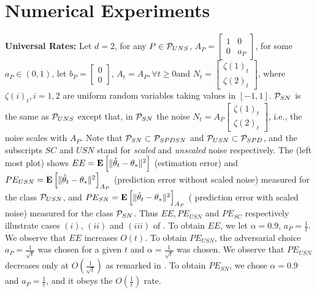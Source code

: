 \section{Numerical Experiments}\label{sec:exp}

\textbf{Universal Rates:} Let $d=2$, for any $P\in \P_{UNS}$, $A_P=\left[\begin{matrix}1 &0\\ 0 & a_P\end{matrix}\right]$, for some $a_P\in (0,1)$, let $b_P=\left[\begin{matrix}0\\0\end{matrix}\right]$, $A_t=A_P,\forall t\geq 0$and $N_t=\left[\begin{matrix}\zeta(1)_t\\ \zeta(2)_t\end{matrix}\right]$, where $\zeta(i)_t, i=1,2$ are \iid uniform random variables taking values in $[-1,1]$. $\P_{SN}$ is the same as $\P_{UNS}$ except that, in $\P_{SN}$ the noise $N_t=A_P \left[\begin{matrix}\zeta(1)_t\\ \zeta(2)_t\end{matrix}\right]$, i.e., the noise scales with $A_P$. Note that $\P_{SN}\subset \P_{SPDSN}$ and $\P_{USN}\subset \P_{SPD}$, and the subscripts $SC$ and $USN$ stand for \emph{scaled} and \emph{unscaled} noise respectively. 
The  (left most plot) shows $EE=\EE{\normsm{\thh_t-\ts}^2}$ (estimation error) and $PE_{USN}=\EE{\normsm{\thh_t-\ts}^2}_{A_P}$ (prediction error without scaled noise) measured for the class $\P_{USN}$,  and $PE_{SN}=\EE{\normsm{\thh_t-\ts}^2}_{A_P}$ ( prediction error with scaled noise)  measured for the class $\P_{SN}$. Thus $EE, PE_{USN}$ and $PE_{SC}$ respectively illustrate cases $(i)$, $(ii)$ and $(iii)$ of . To obtain $EE$, we let $\alpha=0.9$, $a_P=\frac{1}{t}$. We observe that $EE$ increases $O(t)$. To obtain $PE_{USN}$, the adversarial choice $a_P=\frac{1}{\sqrt{t}}$ was chosen for a given $t$ and $\alpha=\frac{1}{\sqrt{t}}$ was chosen. We observe that $PE_{USN}$ decreases only at $O(\frac{1}{\sqrt{t}})$ as remarked in . To obtain $PE_{SN}$, we chose $\alpha=0.9$ and $a_P=\frac{1}{t}$, and it obeys the $O(\frac{1}{t})$ rate.

